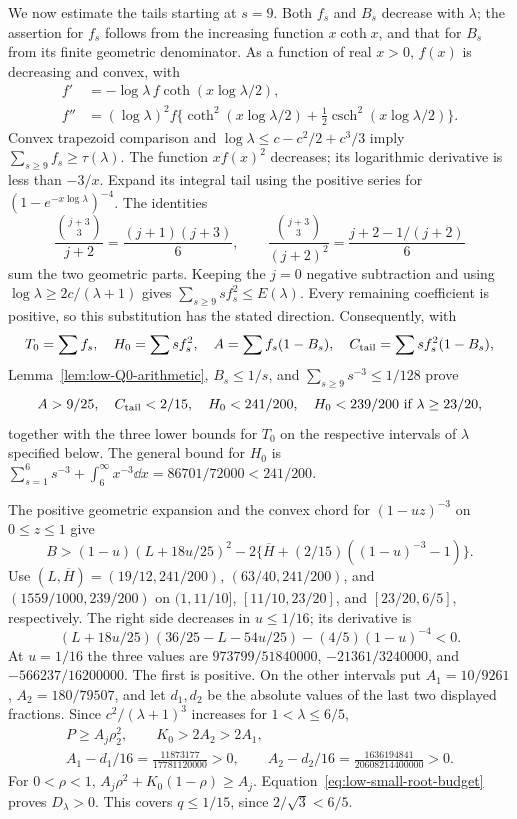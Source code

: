 We now estimate the tails starting at $s=9$. Both $f_s$ and
$B_s$ decrease with $\lambda$; the assertion for $f_s$ follows from
the increasing function $x\coth x$, and that for $B_s$ from its finite
geometric denominator.  As a function of real $x>0$, $f(x)$ is
decreasing and convex, with
\[\begin{aligned}
 f'&=-\log\lambda\, f\coth(x\log\lambda/2),\\
 f''&=(\log\lambda)^2f
       \{\coth^2(x\log\lambda/2)+\tfrac12\operatorname{csch}^2(x\log\lambda/2)\}.
\end{aligned}\]
Convex trapezoid comparison and
$\log\lambda\le c-c^2/2+c^3/3$ imply
$\sum_{s\ge9}f_s\ge\tau(\lambda)$.
The function $xf(x)^2$ decreases; its logarithmic derivative is less
than $-3/x$.  Expand its integral tail using the positive series for
$(1-e^{-x\log\lambda})^{-4}$.  The identities
\[
 \frac{\binom{j+3}{3}}{j+2}=\frac{(j+1)(j+3)}6,\qquad
 \frac{\binom{j+3}{3}}{(j+2)^2}
       =\frac{j+2-1/(j+2)}6
\]
sum the two geometric parts.  Keeping the $j=0$ negative subtraction
and using $\log\lambda\ge2c/(\lambda+1)$ gives
$\sum_{s\ge9}s f_s^2\le E(\lambda)$.
Every remaining coefficient is positive, so this substitution has the
stated direction.  Consequently, with
\[
 T_0=\sum f_s,\quad H_0=\sum s f_s^2,\quad
 A=\sum f_s(1-B_s),\quad C_{\rm tail}=\sum s f_s^2(1-B_s),
\]
Lemma~\ref{lem:low-Q0-arithmetic}, $B_s\le1/s$, and
$\sum_{s\ge9}s^{-3}\le1/128$ prove
\[
 A>9/25,\quad C_{\rm tail}<2/15,\quad H_0<241/200,
 \quad H_0<239/200\ \hbox{if }\lambda\ge23/20,
\]
together with the three lower bounds for $T_0$ on the respective
intervals of $\lambda$ specified below. The general bound for $H_0$ is
$\sum_{s=1}^6s^{-3}+\int_6^\infty x^{-3}\dd x=86701/72000<241/200$.

The positive geometric expansion and the convex chord for
$(1-uz)^{-3}$ on $0\le z\le1$ give
\[
 B>(1-u)(L+18u/25)^2
       -2\{\overline H+(2/15)((1-u)^{-3}-1)\}.
\]
Use $(L,\overline H)=(19/12,241/200)$,
$(63/40,241/200)$, and $(1559/1000,239/200)$ on
$(1,11/10]$, $[11/10,23/20]$, and $[23/20,6/5]$, respectively.
The right side decreases in $u\le1/16$; its derivative is
\[
 (L+18u/25)(36/25-L-54u/25)-(4/5)(1-u)^{-4}<0.
\]
At $u=1/16$ the three values are
$973799/51840000$, $-21361/3240000$, and
$-566237/16200000$.
The first is positive.  On the other intervals put
$A_1=10/9261$, $A_2=180/79507$, and let $d_1,d_2$ be the absolute
values of the last two displayed fractions.  Since
$c^2/(\lambda+1)^3$ increases for $1<\lambda\le6/5$,
\[\begin{gathered}
 P\ge A_j\rho_2^2,\qquad K_0>2A_2>2A_1,\\
 A_1-d_1/16=\frac{11873177}{17781120000}>0,\qquad
 A_2-d_2/16=\frac{1636194841}{20608214400000}>0.
\end{gathered}\]
For $0<\rho<1$,
$A_j\rho^2+K_0(1-\rho)\ge A_j$.
Equation~\eqref{eq:low-small-root-budget} proves $D_\lambda>0$.
This covers $q\le1/15$, since $2/\sqrt3<6/5$.

